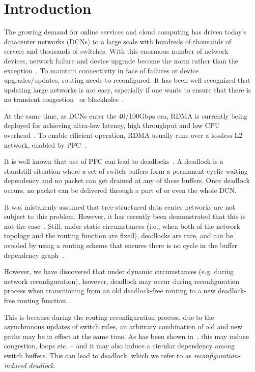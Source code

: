 \section{Introduction}\label{sec:intro}

The growing demand for online services and cloud computing has driven today's
datacenter networks (DCNs) to a large scale with hundreds of thousands of
servers and thousands of switches. With this enormous number of network devices,
network failure and device upgrade become the norm rather than the
exception~\cite{zupdate, netpilot}. To maintain connectivity in face of
failures or device upgrades/updates, routing needs to reconfigured. It has been
well-recognized that updating large networks is not easy, especially if one
wants to ensure that there is no transient congestion~\cite{zupdate} or
blackholes~\cite{dionysus}.

At the same time, as DCNs enter the 40/100Gbps era, RDMA is currently being
deployed for achieving ultra-low latency, high throughput and low CPU
overhead~\cite{dcqcn,timely,rdmaatscale}.  To enable efficient operation,
RDMA usually runs over a  lossless L2 network, enabled by PFC~\cite{dcqcn}.

It is well known that use of PFC can lead to deadlocks~\cite{tcp-bolt}.  A
deadlock is a standstill situation where a set of switch buffers form a
permanent cyclic waiting dependency and no packet can get drained at any of
these buffers. Once deadlock occurs, no packet can be delivered through a part
of or even the whole DCN.

It was mistakenly assumed that tree-structured data center networks are not
subject to this problem. However, it has recently been demonstrated that this is
not the case~\cite{rdmaatscale}. Still, under static circumstances (i.e.,
when both of the network topology and the routing function are fixed), deadlocks
are rare, and can be avoided by using a routing scheme that ensures there is no
cycle in the buffer dependency graph~\cite{tcp-bolt}.

However, we have discovered that under dynamic circumstances (e.g. during
network reconfiguration), however, deadlock may occur during reconfiguration
process when transitioning from an old deadlock-free routing to a new
deadlock-free routing function. 

This is because during the routing reconfiguration process, due to the
asynchronous updates of switch rules, an arbitrary combination of old and new
paths may be in effect at the same time.  As has been shown
in~\cite{zupdate,dionysus}, this may induce congestion, loops etc. -- and it
may also induce a circular dependency among switch buffers. This can lead to
deadlock, which we refer to as \textit{reconfiguration-induced deadlock}.

